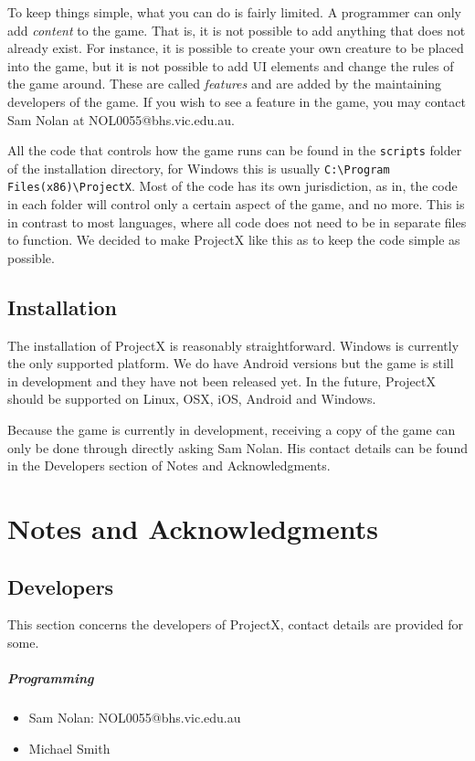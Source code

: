 \documentclass{book}
\begin{document}
	To keep things simple, what you can do is fairly limited. A programmer can only add \textit{content} to the game. That is, it is not possible to add anything that does not already exist. For instance, it is possible to create your own creature to be placed into the game, but it is not possible to add UI elements and change the rules of the game around. These are called \textit{features} and are added by the maintaining developers of the game. If you wish to see a feature in the game, you may contact Sam Nolan at NOL0055@bhs.vic.edu.au.
	
	All the code that controls how the game runs can be found in the \texttt{scripts} folder of the installation directory, for Windows this is usually  \texttt{C:\textbackslash Program Files(x86)\textbackslash ProjectX}. Most of the code has its own jurisdiction, as in, the code in each folder will control only a certain aspect of the game, and no more. This is in contrast to most languages, where all code does not need to be in separate files to function. We decided to make ProjectX like this as to keep the code simple as possible.
	
	\section{Installation}
	The installation of ProjectX is reasonably straightforward. Windows is currently the only supported platform. We do have Android versions but the game is still in development and they have not been released yet. In the future, ProjectX should be supported on Linux, OSX, iOS, Android and Windows.
	
	Because the game is currently in development, receiving a copy of the game can only be done through directly asking Sam Nolan. His contact details can be found in the Developers section of Notes and Acknowledgments.  
	\chapter{Notes and Acknowledgments}
	\section{Developers}
	This section concerns the developers of ProjectX, contact details are provided for some.
	
	\paragraph{Programming}
	\begin{itemize}
		\item Sam Nolan: NOL0055@bhs.vic.edu.au
		\item Michael Smith
	\end{itemize}
	
\end{document}
